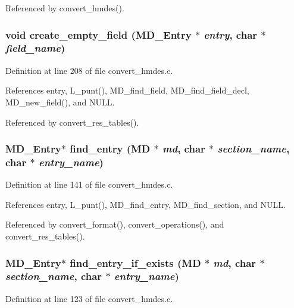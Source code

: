 Referenced by convert\_\-hmdes().
\subsubsection{\setlength{\rightskip}{0pt plus 5cm}void create\_\-empty\_\-field (\bf{MD\_\-Entry} $\ast$ {\em entry}, char $\ast$ {\em field\_\-name})}\label{convert__hmdes_8c_51b19f66e703ea6bc42975c17d0f56f8}




Definition at line 208 of file convert\_\-hmdes.c.

References entry, L\_\-punt(), MD\_\-find\_\-field, MD\_\-find\_\-field\_\-decl, MD\_\-new\_\-field(), and NULL.

Referenced by convert\_\-res\_\-tables().
\subsubsection{\setlength{\rightskip}{0pt plus 5cm}\bf{MD\_\-Entry}$\ast$ find\_\-entry (\bf{MD} $\ast$ {\em md}, char $\ast$ {\em section\_\-name}, char $\ast$ {\em entry\_\-name})}\label{convert__hmdes_8c_f58daa7180bb89cd7f1db6c839e73d24}




Definition at line 141 of file convert\_\-hmdes.c.

References entry, L\_\-punt(), MD\_\-find\_\-entry, MD\_\-find\_\-section, and NULL.

Referenced by convert\_\-format(), convert\_\-operations(), and convert\_\-res\_\-tables().
\subsubsection{\setlength{\rightskip}{0pt plus 5cm}\bf{MD\_\-Entry}$\ast$ find\_\-entry\_\-if\_\-exists (\bf{MD} $\ast$ {\em md}, char $\ast$ {\em section\_\-name}, char $\ast$ {\em entry\_\-name})}\label{convert__hmdes_8c_34bf787819d11144e052c7527984718a}




Definition at line 123 of file convert\_\-hmdes.c.

